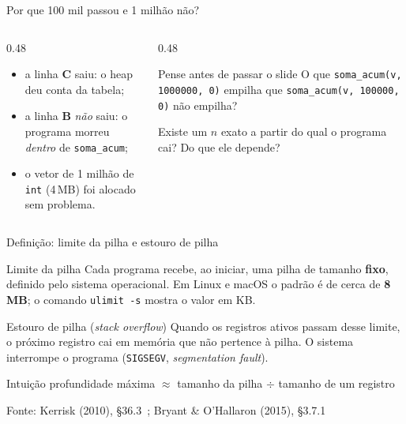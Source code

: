 \documentclass[aspectratio=169]{beamer}
\newcommand{\fonte}[1]{\vfill\hfill{\scriptsize\textcolor{UFSGray}{Fonte: #1}}}
\begin{document}
\begin{frame}{Por que 100 mil passou e 1 milhão não?}
  \begin{columns}[c]
    \begin{column}{0.48\textwidth}
      \small
      \begin{itemize}
        \item a linha \textbf{C} saiu: o heap deu conta da tabela;
        \item a linha \textbf{B} \emph{não} saiu: o programa morreu
          \emph{dentro} de \texttt{soma\_acum};
        \item o vetor de 1 milhão de \texttt{int} (4\,MB) foi alocado sem
          problema.
      \end{itemize}
    \end{column}
    \begin{column}{0.48\textwidth}
      \begin{block}{Pense antes de passar o slide}
        \small
        O que \texttt{soma\_acum(v, 1000000, 0)} empilha que
        \texttt{soma\_acum(v, 100000, 0)} não empilha?

        \medskip
        Existe um $n$ exato a partir do qual o programa cai? Do que ele
        depende?
      \end{block}
    \end{column}
  \end{columns}
\end{frame}

\begin{frame}{Definição: limite da pilha e estouro de pilha}
  \begin{block}{Limite da pilha}
    \small Cada programa recebe, ao iniciar, uma pilha de tamanho
    \textbf{fixo}, definido pelo sistema operacional. Em Linux e macOS o
    padrão é de cerca de \textbf{8\,MB}; o comando \texttt{ulimit -s} mostra
    o valor em KB.
  \end{block}
  \begin{block}{Estouro de pilha (\emph{stack overflow})}
    \small Quando os registros ativos passam desse limite, o próximo
    registro cai em memória que não pertence à pilha. O sistema
    interrompe o programa (\texttt{SIGSEGV}, \emph{segmentation fault}).
  \end{block}
  \begin{exampleblock}{Intuição}
    \small profundidade máxima $\approx$ tamanho da pilha $\div$ tamanho de
    um registro
  \end{exampleblock}
  \fonte{Kerrisk (2010), §36.3~\cite{kerrisk2010linux};
    Bryant \& O'Hallaron (2015), §3.7.1~\cite{bryant2015computer}}
\end{frame}
\end{document}
